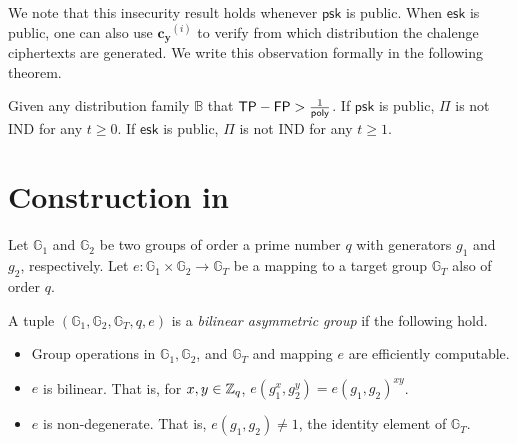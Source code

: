 We note that this insecurity result holds whenever $\textsf{psk}$ is public. When $\textsf{esk}$ is public, one can also use $\mathbf{c_y}^{(i)}$ to verify from which distribution the chalenge ciphertexts are generated. We write this observation formally in the following theorem.

\begin{theorem}

Given any distribution family $\mathbb{B}$ that $\textsf{TP} - \textsf{FP} > \frac{1}{\mathsf{poly}}$. If $\textsf{psk}$ is public, $\Pi$ is not IND for any $t \geq 0$. If $\textsf{esk}$ is public, $\Pi$ is not IND for any $t \geq 1$.

\end{theorem}





\appendix


\section{Construction in \cite{cryptoeprint:2016/440}}
\label{sec:fh-IPFE-construction}

Let $\mathbb{G}_1$ and $\mathbb{G}_2$ be two groups of order a prime number $q$ with generators $g_1$ and $g_2$, respectively. Let $e: \mathbb{G}_1 \times \mathbb{G}_2 \to \mathbb{G}_T$ be a mapping to a target group $\mathbb{G}_T$ also of order $q$. 

\begin{definition}
\label{bilinear-group}

A tuple $(\mathbb{G}_1, \mathbb{G}_2, \mathbb{G}_T, q, e)$ is a \emph{bilinear asymmetric group} if the following hold.

\begin{itemize}

	\item Group operations in $\mathbb{G}_1, \mathbb{G}_2$, and $\mathbb{G}_T$ and mapping $e$ are efficiently computable.

	\item $e$ is bilinear. That is, for $x, y \in \mathbb{Z}_q$, $e(g_1^x, g_2^y) = e(g_1, g_2)^{xy}$.

	\item $e$ is non-degenerate. That is, $e(g_1, g_2) \neq 1$, the identity element of $\mathbb{G}_T$.

\end{itemize}

\end{definition}

